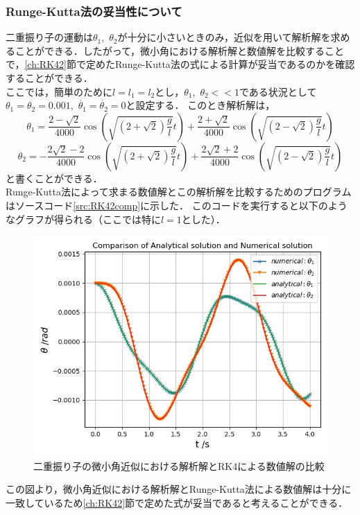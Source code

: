 \documentclass[a4paper,11pt]{jsarticle}
\begin{document}
\subsubsection{Runge-Kutta法の妥当性について}
二重振り子の運動は\(\theta_1\),\ \(\theta_2\)が十分に小さいときのみ，近似を用いて解析解を求めることができる．したがって，微小角における解析解と数値解を比較することで，\ref{ch:RK42}節で定めたRunge-Kutta法の式による計算が妥当であるのかを確認することができる．\\
ここでは，簡単のために\(l = l_1 = l_2\)とし，\(\theta_1\),\ \(\theta_2 << 1\)である状況として\(\theta_1 = \theta_2 = 0.001\),\ \(\dot{\theta_1} = \dot{\theta_2} = 0\)と設定する．
このとき解析解は，
\begin{equation}
  \theta_1 = \dfrac{2-\sqrt{2}}{4000}\cos{(\sqrt{(2+\sqrt{2})\dfrac{g}{l}}t)} + \dfrac{2+\sqrt{2}}{4000}\cos{(\sqrt{(2-\sqrt{2})\dfrac{g}{l}}t)}
\end{equation}
\begin{equation}
  \theta_2 = -\dfrac{2\sqrt{2}-2}{4000}\cos{(\sqrt{(2+\sqrt{2})\dfrac{g}{l}}t)} + \dfrac{2\sqrt{2}+2}{4000}\cos{(\sqrt{(2-\sqrt{2})\dfrac{g}{l}}t)}
\end{equation}
と書くことができる．\\
Runge-Kutta法によって求まる数値解とこの解析解を比較するためのプログラムはソースコード\ref{src:RK42comp}に示した．
このコードを実行すると以下のようなグラフが得られる（ここでは特に\(l=1\)とした）．
\begin{figure}[H]
  \begin{center}
    \includegraphics[scale=0.9]{figure/RK42/comparison1/2021-2-9-143754.jpeg}
    \caption{二重振り子の微小角近似における解析解とRK4による数値解の比較}
    \label{fig:RK42comp}
  \end{center}
\end{figure}
この図より，微小角近似における解析解とRunge-Kutta法による数値解は十分に一致しているため\ref{ch:RK42}節で定めた式が妥当であると考えることができる．
\newpage
\end{document}
